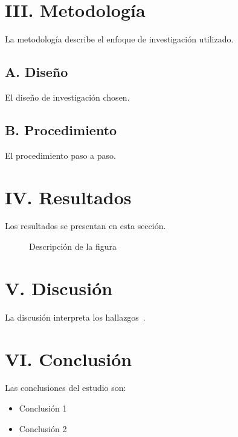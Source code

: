 \documentclass[conference, a4paper]{IEEEtran}
\begin{document}
\section{III. Metodología}
\label{sec:metodologia}
La metodología describe el enfoque de investigación utilizado.

\subsection{A. Diseño}
El diseño de investigación chosen.

\subsection{B. Procedimiento}
El procedimiento paso a paso.

\section{IV. Resultados}
\label{sec:resultados}
Los resultados se presentan en esta sección.

\begin{figure}[htbp]
\centering
\caption{Descripción de la figura}
\label{fig:resultado}
\end{figure}

\section{V. Discusión}
\label{sec:discusion}
La discusión interpreta los hallazgos~\cite{referencia3}.

\section{VI. Conclusión}
\label{sec:conclusion}
Las conclusiones del estudio son:

\begin{itemize}
    \item Conclusión 1
    \item Conclusión 2
\end{itemize}
\end{document}
